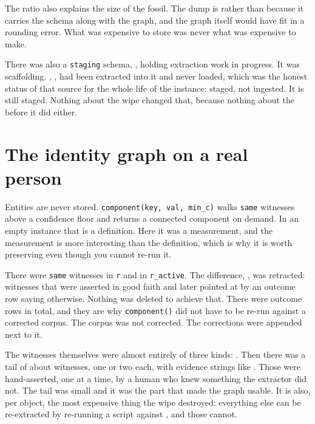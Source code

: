 The ratio also explains the size of the fossil. The dump is \labLineageSize{} rather than \labLineageGraphTotalSize{} because it carries the \labLineageBlobSchema{} schema along with the graph, and the graph itself would have fit in a rounding error. What was expensive to store was never what was expensive to make.

There was also a \texttt{staging} schema, \labLineageStagingSize{}, holding extraction work in progress. It was scaffolding. \labLineageStagedSource{}, \labLineageStagedCount{}, had been extracted into it and never loaded, which was the honest status of that source for the whole life of the instance: staged, not ingested. It is still staged. Nothing about the wipe changed that, because nothing about the \labLineageLifetime{} before it did either.

\section{The identity graph on a real person}

Entities are never stored. \texttt{component(key, val, min\_c)} walks \texttt{same} witnesses above a confidence floor and returns a connected component on demand. In an empty instance that is a definition. Here it was a measurement, and the measurement is more interesting than the definition, which is why it is worth preserving even though you cannot re-run it.

There were \labLineageSameRaw{} \texttt{same} witnesses in \texttt{r} and \labLineageSameActive{} in \texttt{r\_active}. The difference, \labLineageSameRetracted{}, was retracted: witnesses that were asserted in good faith and later pointed at by an outcome row saying otherwise. Nothing was deleted to achieve that. There were \labLineageOutcomes{} outcome rows in total, and they are why \texttt{component()} did not have to be re-run against a corrected corpus. The corpus was not corrected. The corrections were appended next to it.

The witnesses themselves were almost entirely of three kinds: \labLineageWitnessKinds{}. Then there was a tail of about \labLineageHandCount{} witnesses, one or two each, with evidence strings like \labLineageWitnessEvidence{}. Those were hand-asserted, one at a time, by a human who knew something the extractor did not. The tail was small and it was the part that made the graph usable. It is also, per object, the most expensive thing the wipe destroyed: everything else can be re-extracted by re-running a script against \labLineageSourceRaw{}, and those \labLineageHandCount{} cannot.

